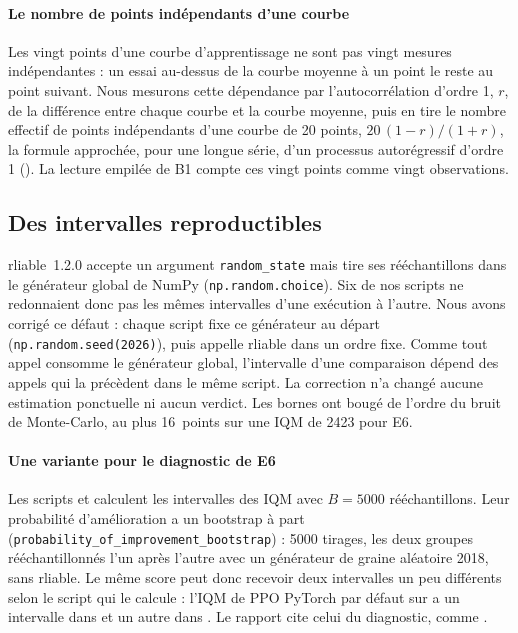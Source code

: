 \paragraph{Le nombre de points indépendants d'une courbe}
Les vingt points d'une courbe d'apprentissage ne sont pas vingt mesures indépendantes : un essai au-dessus de la
courbe moyenne à un point le reste au point suivant. Nous mesurons cette dépendance par l'autocorrélation
d'ordre 1, $r$, de la différence entre chaque courbe et la courbe moyenne, puis en tire le nombre effectif de points
indépendants d'une courbe de 20 points, $20\,(1-r)/(1+r)$, la formule approchée, pour une longue série, d'un
processus autorégressif d'ordre 1
(). La lecture empilée de B1 compte ces vingt points comme vingt observations.

\subsection{Des intervalles reproductibles}\label{sec:reproductibilite-bootstrap}
rliable~1.2.0 accepte un argument \texttt{random\_state} mais tire ses rééchantillons dans le générateur global
de NumPy (\texttt{np.random.choice}). Six de nos scripts ne redonnaient donc pas les mêmes intervalles d'une
exécution à l'autre. Nous avons corrigé ce défaut : chaque script fixe ce générateur au départ
(\texttt{np.random.seed(2026)}), puis appelle rliable dans un ordre fixe. Comme tout appel consomme le
générateur global, l'intervalle d'une comparaison dépend des appels qui la précèdent dans le même script. La correction
n'a changé aucune estimation ponctuelle ni aucun verdict. Les bornes ont bougé de l'ordre du bruit de
Monte-Carlo, au plus 16~points sur une IQM de \num{2423} pour E6.

\paragraph{Une variante pour le diagnostic de E6}
Les scripts  et  calculent les intervalles des IQM avec
$B=\num{5000}$ rééchantillons. Leur probabilité d'amélioration a un bootstrap à part
(\texttt{probability\_of\_improvement\_bootstrap}) : \num{5000} tirages, les deux groupes rééchantillonnés
l'un après l'autre avec un générateur de graine aléatoire 2018, sans rliable. Le même score peut donc recevoir deux
intervalles un peu différents selon le script qui le calcule : l'IQM de PPO PyTorch par défaut sur
 a un intervalle dans  et un autre dans . Le rapport cite
celui du diagnostic, comme .

